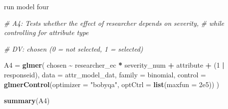 \documentclass[
]{article}
\newenvironment{Shaded}{\begin{snugshade}}{\end{snugshade}}
\newcommand{\AttributeTok}[1]{\textcolor[rgb]{0.13,0.29,0.53}{#1}}
\newcommand{\CommentTok}[1]{\textcolor[rgb]{0.56,0.35,0.01}{\textit{#1}}}
\newcommand{\DecValTok}[1]{\textcolor[rgb]{0.00,0.00,0.81}{#1}}
\newcommand{\FloatTok}[1]{\textcolor[rgb]{0.00,0.00,0.81}{#1}}
\newcommand{\FunctionTok}[1]{\textcolor[rgb]{0.13,0.29,0.53}{\textbf{#1}}}
\newcommand{\NormalTok}[1]{#1}
\newcommand{\OtherTok}[1]{\textcolor[rgb]{0.56,0.35,0.01}{#1}}
\newcommand{\SpecialCharTok}[1]{\textcolor[rgb]{0.81,0.36,0.00}{\textbf{#1}}}
\newcommand{\StringTok}[1]{\textcolor[rgb]{0.31,0.60,0.02}{#1}}
\begin{document}
run model four

\begin{Shaded}
\begin{Highlighting}[]
\CommentTok{\# A4: Tests whether the effect of researcher depends on severity,}
\CommentTok{\# while controlling for attribute type}

\CommentTok{\# DV: chosen (0 = not selected, 1 = selected)}

\NormalTok{A4 }\OtherTok{=} \FunctionTok{glmer}\NormalTok{(}
\NormalTok{  chosen }\SpecialCharTok{\textasciitilde{}}\NormalTok{ researcher\_ec }\SpecialCharTok{*}\NormalTok{ severity\_num }\SpecialCharTok{+}\NormalTok{ attribute }\SpecialCharTok{+}
\NormalTok{    (}\DecValTok{1} \SpecialCharTok{|}\NormalTok{ responseid),}
  \AttributeTok{data =}\NormalTok{ attr\_model\_dat,}
  \AttributeTok{family =}\NormalTok{ binomial,}
  \AttributeTok{control =} \FunctionTok{glmerControl}\NormalTok{(}\AttributeTok{optimizer =} \StringTok{"bobyqa"}\NormalTok{, }\AttributeTok{optCtrl =} \FunctionTok{list}\NormalTok{(}\AttributeTok{maxfun =} \FloatTok{2e5}\NormalTok{))}
\NormalTok{)}

\FunctionTok{summary}\NormalTok{(A4)}
\end{Highlighting}
\end{Shaded}
\end{document}
